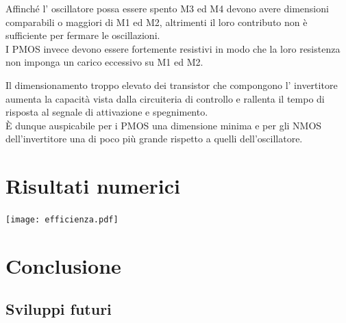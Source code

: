 \documentclass[a4paper, 12pt]{memoir}
\begin{document}
Affinché l' oscillatore possa essere spento M3 ed M4 devono avere dimensioni 
comparabili o maggiori di M1 ed M2, altrimenti il loro contributo non è 
sufficiente per fermare le oscillazioni.\\
I PMOS invece devono essere fortemente resistivi in modo che la loro resistenza
non imponga un carico eccessivo su M1 ed M2.

Il dimensionamento troppo elevato dei transistor che compongono l' invertitore
aumenta la capacità vista dalla circuiteria di controllo e rallenta il tempo di 
risposta al segnale di attivazione e spegnimento.\\
\`E dunque auspicabile per i PMOS una dimensione minima e per gli NMOS 
dell'invertitore una di poco più grande rispetto a quelli dell'oscillatore.
\cleardoublepage{}
\chapter{Risultati numerici}
\texttt{[image: efficienza.pdf]}

\cleardoublepage{}
\chapter{Conclusione}

\section{Sviluppi futuri}



\end{document}
